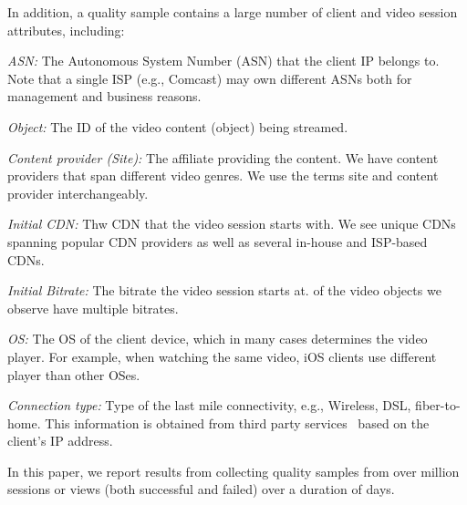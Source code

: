 
In addition, a quality sample contains a large number of client and
video session attributes, including:

\begin{packedenumerate}
\item \emph{ASN:} The Autonomous System Number (ASN) that the client
  IP belongs to. Note that a single ISP (e.g., Comcast) may own
  different ASNs both for management and business reasons.


\item \emph{Object:} The ID of the video content (object) being
  streamed.

\item \emph{Content provider (Site):} The affiliate providing the
  content. We have \fillme content providers that span different video
  genres.  We use the terms site and content provider interchangeably.

\item \emph{Initial CDN:} Thw CDN that the video session starts with.
  We see \fillme unique CDNs spanning popular CDN providers as well as
  several in-house and ISP-based CDNs. 

\item \emph{Initial Bitrate:} The bitrate the video session
  starts at. \fillme of the video objects we
  observe have multiple bitrates.

\item \emph{OS:} The OS of the client device, which in many cases
  determines the video player. For example, when watching the same
  video, iOS clients use different player than other OSes.

\item \emph{Connection type:} Type of the last mile connectivity,
  e.g., Wireless, DSL, fiber-to-home. This information is obtained
  from third party services~\cite{quova} based on the client's IP
  address.
\end{packedenumerate}

  In this paper, we report results from collecting quality samples
  from over \fillme million sessions or views (both successful and
  failed) over a duration of \fillme days.


